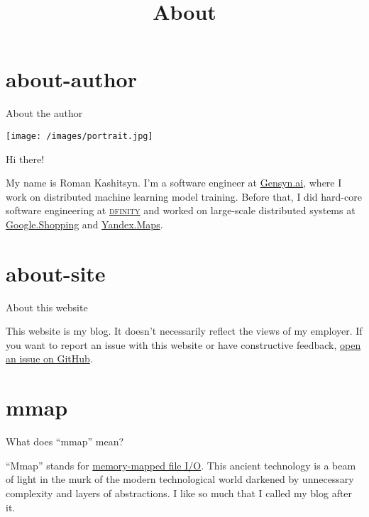 \documentclass{article}
\title{About}
\begin{document}
\section{about-author}{About the author}

\texttt{[image: /images/portrait.jpg]}

Hi there!

My name is Roman Kashitsyn.
I'm a software engineer at \href{https://www.gensyn.ai/}{Gensyn.ai}, where I work on distributed machine learning model training.
Before that, I did hard-core software engineering at \href{https://dfinity.org}{\textsc{dfinity}} and worked on large-scale distributed systems at \href{https://shopping.google.com/}{Google.Shopping} and \href{https://yandex.ru/maps}{Yandex.Maps}.

\section{about-site}{About this website}

This website is my blog.
It doesn't necessarily reflect the views of my employer.
If you want to report an issue with this website or have constructive feedback, \href{https://github.com/roman-kashitsyn/mmapped.blog/issues/new}{open an issue on GitHub}.

\section{mmap}{What does ``mmap'' mean?}

``Mmap'' stands for \href{https://en.wikipedia.org/wiki/Mmap}{memory-mapped file I/O}.
This ancient technology is a beam of light in the murk of the modern technological world darkened by unnecessary complexity and layers of abstractions.
I like \href{https://www.man7.org/linux/man-pages/man2/mmap.2.html}{} so much that I called my blog after it.
\end{document}
